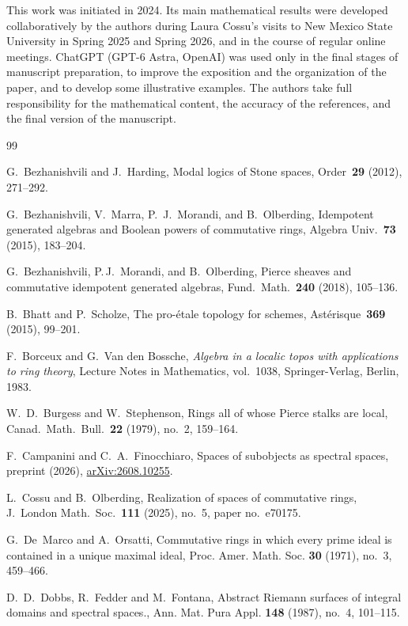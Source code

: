 \documentclass[11pt]{amsart}
\begin{document}
This work was initiated in 2024. Its main mathematical results were developed collaboratively by the authors during Laura Cossu’s visits to New Mexico State University in Spring 2025 and Spring 2026, and in the course of regular online meetings. ChatGPT (GPT-6 Astra, OpenAI) was used only in the final stages of manuscript preparation, to improve the exposition and the organization of the paper, and to develop some illustrative examples. The authors take full responsibility for the mathematical content, the accuracy of the references, and the final version of the manuscript.

\begin{thebibliography}{99}

 G.~Bezhanishvili and J.~Harding, Modal logics of Stone spaces, Order~\textbf{29} (2012), 271--292.

 G.~Bezhanishvili, V.~Marra, P.~J.~Morandi, and B.~Olberding, Idempotent generated algebras and Boolean powers of commutative rings, Algebra Univ.~\textbf{73} (2015), 183--204.

 G.~Bezhanishvili,   P.\,J.~Morandi, and B.~Olberding, Pierce sheaves and commutative idempotent generated algebras, Fund.~Math.~\textbf{240} (2018), 105--136.

 B.~Bhatt and P.~Scholze, The pro-\'etale topology for schemes, Ast\'erisque~\textbf{369} (2015), 99--201.

 F.~Borceux and G.~Van den Bossche, {\it Algebra in a localic topos with applications to ring theory}, Lecture Notes in Mathematics, vol.~1038, Springer-Verlag, Berlin, 1983.

 W.~D.~Burgess and W.~Stephenson, Rings all of whose Pierce stalks are local, Canad.~Math.~Bull.~\textbf{22} (1979), no.~2, 159--164.

  F.~Campanini and C.~A.~Finocchiaro, Spaces of subobjects as spectral spaces, preprint (2026), \href{https://arxiv.org/abs/2608.10255}{arXiv:2608.10255}.

 L.~Cossu and B.~Olberding, {Realization of spaces of commutative rings}, J.~London Math.~Soc.~\textbf{111} (2025), no.~5, paper no.~e70175.

 G.~De~Marco and A.~Orsatti, {Commutative rings in which every prime ideal is contained in a unique maximal ideal}, Proc. Amer. Math. Soc. \textbf{30} (1971), no.~3, 459--466.

 D.~D.~Dobbs, R.~Fedder and M.~Fontana, 
Abstract Riemann surfaces of integral domains and spectral spaces.,
Ann. Mat. Pura Appl. \textbf{148} (1987), no.~4, 101--115.


\end{thebibliography}
\end{document}
